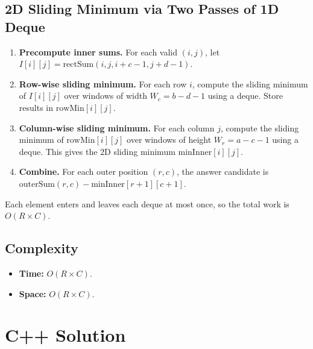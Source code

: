 \documentclass[11pt,a4paper]{article}
\begin{document}
\subsection{2D Sliding Minimum via Two Passes of 1D Deque}
\begin{enumerate}
    \item \textbf{Precompute inner sums.} For each valid $(i,j)$, let $I[i][j] = \text{rectSum}(i, j, i{+}c{-}1, j{+}d{-}1)$.
    \item \textbf{Row-wise sliding minimum.} For each row $i$, compute the sliding minimum of $I[i][j]$ over windows of width $W_c = b - d - 1$ using a deque. Store results in $\text{rowMin}[i][j]$.
    \item \textbf{Column-wise sliding minimum.} For each column $j$, compute the sliding minimum of $\text{rowMin}[i][j]$ over windows of height $W_r = a - c - 1$ using a deque. This gives the 2D sliding minimum $\text{minInner}[i][j]$.
    \item \textbf{Combine.} For each outer position $(r, c)$, the answer candidate is $\text{outerSum}(r, c) - \text{minInner}[r+1][c+1]$.
\end{enumerate}

Each element enters and leaves each deque at most once, so the total work is $O(R \times C)$.

\subsection{Complexity}
\begin{itemize}
    \item \textbf{Time:} $O(R \times C)$.
    \item \textbf{Space:} $O(R \times C)$.
\end{itemize}

\section{C++ Solution}
\end{document}
